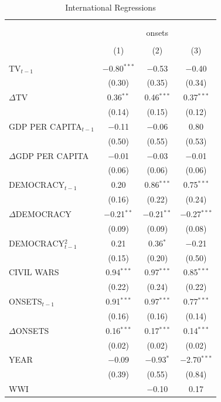 \documentclass[11pt,article,oneside]{memoir}
\begin{document}
\begin{table}[!htbp] \centering 
  \caption{International Regressions} 
  \label{} 
\footnotesize 
\begin{tabular}{@{\extracolsep{5pt}}lccc} 
\\[-1.8ex]\hline \\[-1.8ex] 
\\[-1.8ex] & \multicolumn{3}{c}{onsets} \\ 
\\[-1.8ex] & (1) & (2) & (3)\\ 
\hline \\[-1.8ex] 
 TV$_{t-1}$ & $-$0.80$^{***}$ & $-$0.53 & $-$0.40 \\ 
  & (0.30) & (0.35) & (0.34) \\ 
  $\Delta$TV & 0.36$^{**}$ & 0.46$^{***}$ & 0.37$^{***}$ \\ 
  & (0.14) & (0.15) & (0.12) \\ 
  GDP PER CAPITA$_{t-1}$ & $-$0.11 & $-$0.06 & 0.80 \\ 
  & (0.50) & (0.55) & (0.53) \\ 
  $\Delta$GDP PER CAPITA & $-$0.01 & $-$0.03 & $-$0.01 \\ 
  & (0.06) & (0.06) & (0.06) \\ 
  DEMOCRACY$_{t-1}$ & 0.20 & 0.86$^{***}$ & 0.75$^{***}$ \\ 
  & (0.16) & (0.22) & (0.24) \\ 
  $\Delta$DEMOCRACY & $-$0.21$^{**}$ & $-$0.21$^{**}$ & $-$0.27$^{***}$ \\ 
  & (0.09) & (0.09) & (0.08) \\ 
  DEMOCRACY$^2_{t-1}$ & 0.21 & 0.36$^{*}$ & $-$0.21 \\ 
  & (0.15) & (0.20) & (0.50) \\ 
  CIVIL WARS & 0.94$^{***}$ & 0.97$^{***}$ & 0.85$^{***}$ \\ 
  & (0.22) & (0.24) & (0.22) \\ 
  ONSETS$_{t-1}$ & 0.91$^{***}$ & 0.97$^{***}$ & 0.77$^{***}$ \\ 
  & (0.16) & (0.16) & (0.14) \\ 
  $\Delta$ONSETS & 0.16$^{***}$ & 0.17$^{***}$ & 0.14$^{***}$ \\ 
  & (0.02) & (0.02) & (0.02) \\ 
  YEAR & $-$0.09 & $-$0.93$^{*}$ & $-$2.70$^{***}$ \\ 
  & (0.39) & (0.55) & (0.84) \\ 
  WWI &  & $-$0.10 & 0.17 \\ 

\end{tabular}
\end{table}
\end{document}
